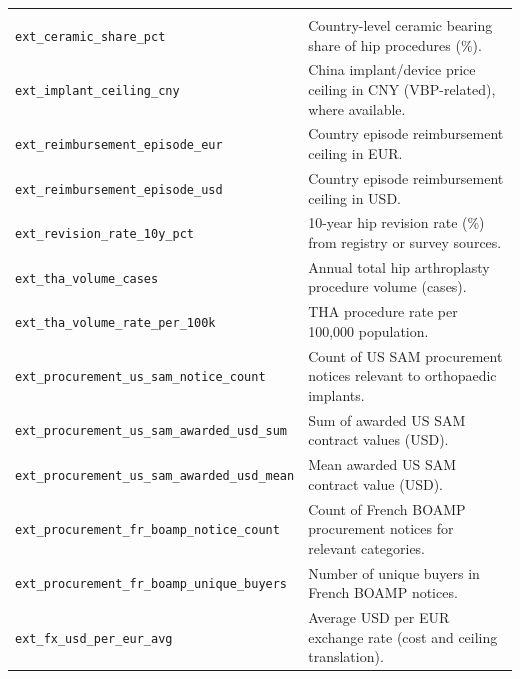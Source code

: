 \documentclass{article}
\begin{document}
\begin{longtable}{@{}p{5.4cm} p{10.6cm}@{}}
\rowcolor{gray!20} \multicolumn{2}{@{}l}{\textit{External market context}} \\
\texttt{ext\_\allowbreak ceramic\_\allowbreak share\_\allowbreak pct} & Country-level ceramic bearing share of hip procedures (\%). \\
\texttt{ext\_\allowbreak implant\_\allowbreak ceiling\_\allowbreak cny} & China implant/device price ceiling in CNY (VBP-related), where available. \\
\texttt{ext\_\allowbreak reimbursement\_\allowbreak episode\_\allowbreak eur} & Country episode reimbursement ceiling in EUR. \\
\texttt{ext\_\allowbreak reimbursement\_\allowbreak episode\_\allowbreak usd} & Country episode reimbursement ceiling in USD. \\
\texttt{ext\_\allowbreak revision\_\allowbreak rate\_\allowbreak 10y\_\allowbreak pct} & 10-year hip revision rate (\%) from registry or survey sources. \\
\texttt{ext\_\allowbreak tha\_\allowbreak volume\_\allowbreak cases} & Annual total hip arthroplasty procedure volume (cases). \\
\texttt{ext\_\allowbreak tha\_\allowbreak volume\_\allowbreak rate\_\allowbreak per\_\allowbreak 100k} & THA procedure rate per 100,000 population. \\
\texttt{ext\_\allowbreak procurement\_\allowbreak us\_\allowbreak sam\_\allowbreak notice\_\allowbreak count} & Count of US SAM procurement notices relevant to orthopaedic implants. \\
\texttt{ext\_\allowbreak procurement\_\allowbreak us\_\allowbreak sam\_\allowbreak awarded\_\allowbreak usd\_\allowbreak sum} & Sum of awarded US SAM contract values (USD). \\
\texttt{ext\_\allowbreak procurement\_\allowbreak us\_\allowbreak sam\_\allowbreak awarded\_\allowbreak usd\_\allowbreak mean} & Mean awarded US SAM contract value (USD). \\
\texttt{ext\_\allowbreak procurement\_\allowbreak fr\_\allowbreak boamp\_\allowbreak notice\_\allowbreak count} & Count of French BOAMP procurement notices for relevant categories. \\
\texttt{ext\_\allowbreak procurement\_\allowbreak fr\_\allowbreak boamp\_\allowbreak unique\_\allowbreak buyers} & Number of unique buyers in French BOAMP notices. \\
\texttt{ext\_\allowbreak fx\_\allowbreak usd\_\allowbreak per\_\allowbreak eur\_\allowbreak avg} & Average USD per EUR exchange rate (cost and ceiling translation). \\

\end{longtable}
\end{document}
